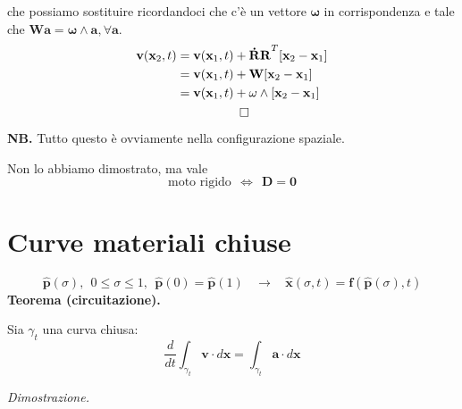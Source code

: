 \documentclass[10pt,a4paper,twoside]{book}
\begin{document}
che possiamo sostituire ricordandoci che c'è un vettore $\mathbf{\omega }$ in corrispondenza e tale che $\mathbf{Wa} =\mathbf{\omega } \land \mathbf{a} ,\forall \mathbf{a}$.
\begin{gather*}
\begin{aligned}
\mathbf{v}(\mathbf{x}_{2} ,t) & =\mathbf{v}(\mathbf{x}_{1} ,t) +\mathbf{\dot{\mathbf{R}} R}^{T}[\mathbf{x}_{2} -\mathbf{x}_{1}]\\
 & =\mathbf{v}(\mathbf{x}_{1} ,t) +\mathbf{W}[\mathbf{x}_{2} -\mathbf{x}_{1}]\\
 & =\mathbf{v}(\mathbf{x}_{1} ,t) +\mathbf{\omega } \land [\mathbf{x}_{2} -\mathbf{x}_{1}]
\end{aligned}\\
\qed 
\end{gather*}
\textbf{NB.} Tutto questo è ovviamente nella configurazione spaziale.
\begin{oss}
Non lo abbiamo dimostrato, ma vale
\begin{equation*}
\boxed{\text{moto rigido} \ \ \Leftrightarrow \ \ \mathbf{D} =\mathbf{0}}
\end{equation*}
\end{oss}
\section{Curve materiali chiuse}


\begin{equation*}
\hat{\mathbf{p}}( \sigma ) ,\ \ 0\leqslant \sigma \leqslant 1,\ \ \hat{\mathbf{p}}( 0) =\hat{\mathbf{p}}( 1) \ \ \ \ \rightarrow \ \ \ \ \hat{\mathbf{x}}( \sigma ,t) =\mathbf{f}(\hat{\mathbf{p}}( \sigma ) ,t)
\end{equation*}
\textbf{Teorema (circuitazione).}

Sia $\gamma _{t}$ una curva chiusa:
\begin{equation*}
\boxed{\frac{d}{dt}\int _{\gamma _{t}}\mathbf{v} \cdotp d\mathbf{x} =\int _{\gamma _{t}}\mathbf{a} \cdotp d\mathbf{x}}
\end{equation*}


\textit{Dimostrazione.}
\end{document}
